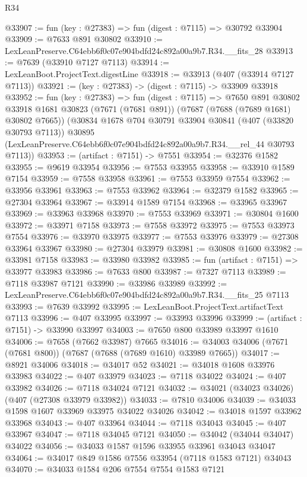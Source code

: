 \begin{lexlean}{R34}
\begin{coremodule}
@33907 := fun (key : @27383) => fun (digest : @7115) => @30792 @33904
@33909 := @7633 @891 @30802
@33910 := LexLeanPreserve.C64ebb6f0c07e904bdfd24c892a00a9b7.R34.__fits_28
@33913 := @7639 (@33910 @7127 @7113)
@33914 := LexLeanBoot.ProjectText.digestLine
@33918 := @33913 (@407 (@33914 @7127 @7113))
@33921 := (key : @27383) -> (digest : @7115) -> @33909 @33918
@33952 := fun (key : @27383) =>
  fun (digest : @7115) =>
  @7650
    @891
    @30802
    @33918
    @1681
    @30823
    (@7671 (@7681 @891))
    (@7687 (@7688 (@7689 @1681) @30802 @7665))
    (@30834
      @1678
      @704
      @30791
      @33904
      @30841
      (@407 (@33820 @30793 @7113))
      @30895
      (LexLeanPreserve.C64ebb6f0c07e904bdfd24c892a00a9b7.R34.__rel_44 @30793 @7113))
@33953 := (artifact : @7151) -> @7551
@33954 := @32376 @1582
@33955 := @9619 @33954
@33956 := @7553 @33955
@33958 := @33910 @1589 @7154
@33959 := @7558 @33958
@33961 := @7553 @33959 @7554
@33962 := @33956 @33961
@33963 := @7553 @33962
@33964 := @32379 @1582
@33965 := @27304 @33964
@33967 := @33914 @1589 @7154
@33968 := @33965 @33967
@33969 := @33963 @33968
@33970 := @7553 @33969
@33971 := @30804 @1600
@33972 := @33971 @7158
@33973 := @7558 @33972
@33975 := @7553 @33973 @7554
@33976 := @33970 @33975
@33977 := @7553 @33976
@33979 := @27308 @33964 @33967
@33980 := @27304 @33979
@33981 := @30808 @1600
@33982 := @33981 @7158
@33983 := @33980 @33982
@33985 := fun (artifact : @7151) => @33977 @33983
@33986 := @7633 @800
@33987 := @7327 @7113
@33989 := @7118 @33987 @7121
@33990 := @33986 @33989
@33992 := LexLeanPreserve.C64ebb6f0c07e904bdfd24c892a00a9b7.R34.__fits_25 @7113
@33993 := @7639 @33992
@33995 := LexLeanBoot.ProjectText.artifactText @7113
@33996 := @407 @33995
@33997 := @33993 @33996
@33999 := (artifact : @7151) -> @33990 @33997
@34003 := @7650 @800 @33989 @33997 @1610
@34006 := @7658 (@7662 @33987) @7665
@34016 := @34003 @34006 (@7671 (@7681 @800)) (@7687 (@7688 (@7689 @1610) @33989 @7665))
@34017 := @8921 @34006
@34018 := @34017 @52
@34021 := @34018 @1608 @33976 @33983
@34022 := @407 @33979
@34023 := @7118 @34022
@34024 := @407 @33982
@34026 := @7118 @34024 @7121
@34032 := @34021 (@34023 @34026) (@407 (@27308 @33979 @33982))
@34033 := @7810 @34006
@34039 := @34033 @1598 @1607 @33969 @33975 @34022 @34026
@34042 := @34018 @1597 @33962 @33968
@34043 := @407 @33964
@34044 := @7118 @34043
@34045 := @407 @33967
@34047 := @7118 @34045 @7121
@34050 := @34042 (@34044 @34047) @34022
@34056 := @34033 @1587 @1596 @33955 @33961 @34043 @34047
@34064 := @34017 @849 @1586 @7556 @33954 (@7118 @1583 @7121) @34043
@34070 := @34033 @1584 @206 @7554 @7554 @1583 @7121

\end{coremodule}
\end{lexlean}
